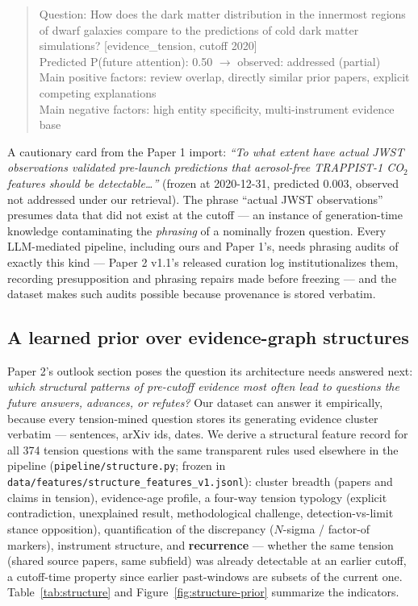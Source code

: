 \documentclass[11pt]{article}
\begin{document}
\begin{quote}\small\ttfamily\raggedright
Question: How does the dark matter distribution in the innermost regions
of dwarf galaxies compare to the predictions of cold dark matter
simulations? [evidence\_tension, cutoff 2020]\\
Predicted P(future attention): 0.50 $\rightarrow$ observed: addressed
(partial)\\
Main positive factors: review overlap, directly similar prior papers,
explicit competing explanations\\
Main negative factors: high entity specificity, multi-instrument
evidence base
\end{quote}

A cautionary card from the Paper 1 import: \emph{``To what extent have
actual JWST observations validated pre-launch predictions that
aerosol-free TRAPPIST-1 CO$_2$ features should be detectable\ldots''}
(frozen at 2020-12-31, predicted 0.003, observed not addressed under our
retrieval). The phrase ``actual JWST observations'' presumes data that
did not exist at the cutoff --- an instance of generation-time knowledge
contaminating the \emph{phrasing} of a nominally frozen question. Every
LLM-mediated pipeline, including ours and Paper 1's, needs phrasing
audits of exactly this kind --- Paper 2 v1.1's released curation log
institutionalizes them, recording presupposition and phrasing repairs
made before freezing --- and the dataset makes such audits possible
because provenance is stored verbatim.

\subsection{A learned prior over evidence-graph structures}
\label{sec:structureprior}

Paper 2's outlook section poses the question its architecture needs
answered next: \emph{which structural patterns of pre-cutoff evidence
most often lead to questions the future answers, advances, or refutes?}
Our dataset can answer it empirically, because every tension-mined
question stores its generating evidence cluster verbatim --- sentences,
arXiv ids, dates. We derive a structural feature record for all 374
tension questions with the same transparent rules used elsewhere in the
pipeline (\texttt{pipeline/structure.py}; frozen in
\texttt{data/features/structure\_features\_v1.jsonl}): cluster breadth
(papers and claims in tension), evidence-age profile, a four-way tension
typology (explicit contradiction, unexplained result, methodological
challenge, detection-vs-limit stance opposition), quantification of the
discrepancy ($N$-sigma / factor-of markers), instrument structure, and
\textbf{recurrence} --- whether the same tension (shared source papers,
same subfield) was already detectable at an earlier cutoff, a
cutoff-time property since earlier past-windows are subsets of the
current one. Table~\ref{tab:structure} and
Figure~\ref{fig:structure-prior} summarize the indicators.
\end{document}
